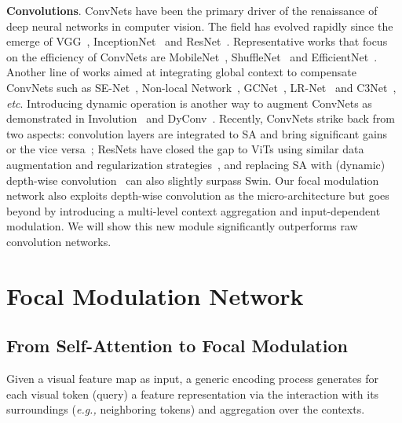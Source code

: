 \documentclass{article}
\newcommand{\eg}[0]{\emph{e.g., }}
\begin{document}
\textbf{Convolutions}. ConvNets have been the primary driver of the renaissance of deep neural networks in computer vision.
The field has evolved rapidly since the emerge of VGG~\cite{simonyan2014very}, InceptionNet~\cite{szegedy2015going} and ResNet~\cite{he2016deep}. Representative works that focus on the efficiency of ConvNets are MobileNet~\cite{howard2017mobilenets}, ShuffleNet~\cite{zhang2018shufflenet} and EfficientNet~\cite{tan2019efficientnet}. Another line of works aimed at integrating global context to compensate ConvNets such as SE-Net~\cite{hu2018squeeze}, Non-local Network~\cite{wang2018non}, GCNet~\cite{cao2019gcnet}, LR-Net~\cite{hu2019local} and C3Net~\cite{yang2019cross}, \textit{etc}. Introducing dynamic operation is another way to augment ConvNets as demonstrated in Involution~\cite{li2021involution} and DyConv~\cite{chen2020dynamic}. 
Recently, ConvNets strike back from two aspects: 
 convolution layers are integrated to SA and bring significant gains~\cite{wu2021cvt,guo2021cmt,li2021localvit,gao2021container} or the vice versa~\cite{touvron2021augmenting};  ResNets have closed the gap to ViTs using similar data augmentation and regularization strategies~\cite{wightman2021resnet}, and replacing SA with (dynamic) depth-wise convolution~\cite{han2021demystifying, liu2022convnet} can also slightly surpass Swin. Our focal modulation network also exploits depth-wise convolution as the micro-architecture but goes beyond by introducing a multi-level context aggregation and input-dependent modulation.
We will show this new module significantly outperforms raw convolution networks.












%
 \section{Focal Modulation Network}
\label{Sec:Method}
\subsection{From Self-Attention to Focal Modulation}
\vspace{-2pt}
Given a visual feature map  as input, a generic encoding process generates for each visual token (query)  a feature representation  via the interaction  with its surroundings  (\eg neighboring tokens) and aggregation  over the contexts. 
\end{document}
